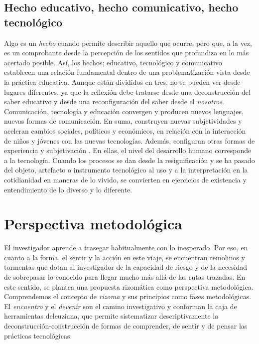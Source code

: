 \documentclass[spanish]{textolivre}
\begin{document}
\subsection{Hecho educativo, hecho comunicativo, hecho tecnológico}\label{sec-hecho}
Algo es un \textit{hecho} cuando permite describir aquello que ocurre, pero que, a la vez, es un comprobante desde la percepción de los sentidos que profundiza en lo más acertado posible. Así, los hechos; educativo, tecnológico y comunicativo establecen una relación fundamental dentro de una problematización vista desde la práctica educativa. Aunque están divididos en tres, no se pueden ver desde lugares diferentes, ya que la reflexión debe tratarse desde una deconstrucción del saber educativo y desde una reconfiguración del saber desde el \textit{nosotros}. Comunicación, tecnología y educación \cite{mejia_comunicacion_2011b} convergen y producen nuevos lenguajes, nuevas formas de comunicación. En suma, construyen nuevas subjetividades y aceleran cambios sociales, políticos y económicos, en relación con la interacción de niños y jóvenes con las nuevas tecnologías. Además, configuran otras formas de experiencia y subjetivación \cite{munoz_culturas_2010a, ramirez_cabanzo_infancias_2013}. En ellas, el nivel del desarrollo humano corresponde a la tecnología. Cuando los procesos se dan desde la resignificación y se ha pasado del objeto, artefacto o instrumento tecnológico al uso y a la interpretación en la cotidianidad en maneras de lo vivido, se convierten en ejercicios de existencia y entendimiento de lo diverso y lo diferente.

\section{Perspectiva metodológica}\label{sec-perspectiva}
El investigador aprende a trasegar habitualmente con lo inesperado. Por eso, en cuanto a la forma, el sentir y la acción en este viaje, se encuentran remolinos y tormentas que dotan al investigador de la capacidad de riesgo y de la necesidad de sobrepasar lo conocido para llegar mucho más allá de las rutas trazadas. En este sentido, se plantea una propuesta rizomática como perspectiva metodológica. Comprendemos el concepto de \textit{rizoma} y sus principios como fases metodológicas. El \textit{encuentro} y el \textit{devenir} son el camino investigativo y conforman la caja de herramientas deleuziana, que permite sistematizar descriptivamente la deconstrucción-construcción de formas de comprender, de sentir y de pensar las prácticas tecnológicas. 
\end{document}
